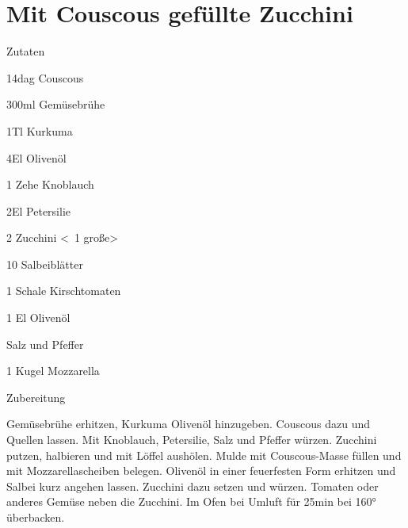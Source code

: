 \chapter*{Mit Couscous gefüllte Zucchini}
\begin{multicols}{2}
 {\Large Zutaten}
 \begin{Zutaten}
		\item 14dag Couscous
		\item 300ml Gemüsebrühe
		\item 1Tl Kurkuma
		\item 4El Olivenöl
		\item 1 Zehe Knoblauch
		\item 2El Petersilie
		\item 2 Zucchini <~1 große>
		\item 10 Salbeiblätter
		\item 1 Schale Kirschtomaten
		\item 1 El Olivenöl
		\item Salz und Pfeffer
		\item 1 Kugel Mozzarella
\end{Zutaten}
	
\columnbreak
\end{multicols}

{\Large Zubereitung} \newline
\begin{addmargin}[1cm]{0cm}
	Gemüsebrühe erhitzen, Kurkuma Olivenöl hinzugeben.\newline
	Couscous dazu und Quellen lassen. Mit Knoblauch, Petersilie, Salz und Pfeffer würzen.\newline
	Zucchini putzen, halbieren und mit Löffel aushölen.\newline
	Mulde mit Couscous-Masse füllen und mit Mozzarellascheiben belegen.\newline
	Olivenöl in einer feuerfesten Form erhitzen und Salbei kurz angehen lassen.
	Zucchini dazu setzen und würzen. Tomaten oder anderes Gemüse neben die Zucchini.\newline
	Im Ofen bei Umluft für 25min bei 160° überbacken.
	
\end{addmargin}
